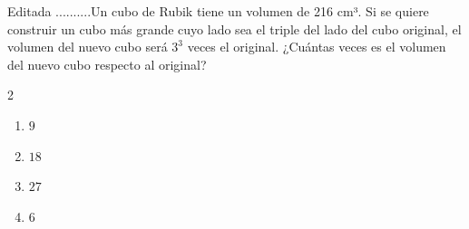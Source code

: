 Editada ..........Un cubo de Rubik tiene un volumen de 216 cm³. Si se quiere construir un cubo más grande cuyo lado sea el triple del lado del cubo original, el volumen del nuevo cubo será $3^3$ veces el original. ¿Cuántas veces es el volumen del nuevo cubo respecto al original?

\begin{multicols}{2}
\begin{enumerate}[label=\alph*)]
\item $9$
\item $18$
\item $27$
\item $6$
\end{enumerate}
\end{multicols}